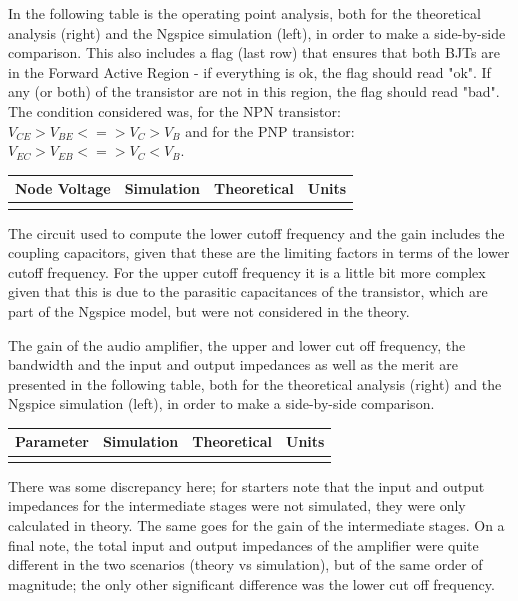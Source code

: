In the following table is the operating point analysis, both for the theoretical analysis (right) and the Ngspice simulation (left), in order to make a side-by-side comparison. This also includes a flag (last row) that ensures that both BJTs are in the Forward Active Region - if everything is ok, the flag should read "ok". If any (or both) of the transistor are not in this region, the flag should read "bad". The condition considered was, for the NPN transistor: $V_{CE} > V_{BE} <=> V_{C} > V_{B}$ and for the PNP transistor: $V_{EC} > V_{EB} <=> V_{C} < V_{B}$.\par

\hfill
 \parbox{1\linewidth}{
  \centering
  \begin{tabular}{|l|l|l|r|}
    \hline    
    {\bf Node Voltage} & {\bf Simulation} & {\bf Theoretical } & {\bf Units }\\ \hline
    
  \label{tab:op_FAR}
  \end{tabular}
  }
\par
The circuit used to compute the lower cutoff frequency and the gain includes the coupling capacitors, given that these are the limiting factors in terms of the lower cutoff frequency. For the upper cutoff frequency it is a little bit more complex given that this is due to the parasitic capacitances of the transistor, which are part of the Ngspice model, but were not considered in the theory.\par 

The gain of the audio amplifier, the upper and lower cut off frequency, the bandwidth and the input and output impedances as well as the merit are presented in the following table, both for the theoretical analysis (right) and the Ngspice simulation (left), in order to make a side-by-side comparison.\par


\hfill
 \parbox{1\linewidth}{
  \centering
  \begin{tabular}{|l|l|l|r|}
    \hline    
    {\bf Parameter} & {\bf Simulation} & {\bf Theoretical } & {\bf Units }\\ \hline
    
  \label{tab:results}
  \end{tabular}
  }
  
  
There was some discrepancy here; for starters note that the input and output impedances for the intermediate stages were not simulated, they were only calculated in theory. The same goes for the gain of the intermediate stages. On a final note, the total input and output impedances of the amplifier were quite different in the two scenarios (theory vs simulation), but of the same order of magnitude; the only other significant difference was the lower cut off frequency.\par

